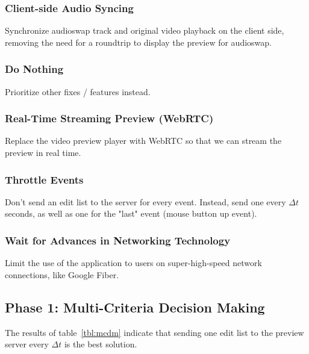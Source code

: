 \documentclass[se,resubmit]{uw-wkrpt}
\begin{document}
\subsubsection{Client-side Audio Syncing}
Synchronize audioswap track and original video playback on the client side,
removing the need for a roundtrip to display the preview for audioswap.

\subsubsection{Do Nothing}
Prioritize other fixes / features instead.

\subsubsection{Real-Time Streaming Preview (WebRTC)}
Replace the video preview player with WebRTC so that we can stream the
preview in real time.

\subsubsection{Throttle Events}
Don't send an edit list to the server for every event. Instead, send one
every $\Delta t$ seconds, as well as one for the "last" event (mouse button up
event).

\subsubsection{Wait for Advances in Networking Technology}
Limit the use of the application to users on super-high-speed network
connections, like Google Fiber.

\subsection{Phase 1: Multi-Criteria Decision Making}
The results of table~\ref{tbl:mcdm} indicate that sending one edit list to
the preview server every $\Delta t$ is the best solution.
\end{document}
